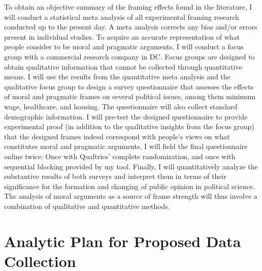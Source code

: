 \documentclass[11pt]{article}
\begin{document}
\vspace{0.3cm}

To obtain an objective summary of the framing effects found in the literature, I will conduct a statistical meta analysis of all experimental framing research conducted up to the present day. A meta analysis corrects any bias and/or errors present in individual studies. To acquire an accurate representation of what people consider to be moral and pragmatic arguments, I will conduct a focus group with a commercial research company in DC. Focus groups are designed to obtain qualitative information that cannot be collected through quantitative means. I will use the results from the quantitative meta analysis and the qualitative focus group to design a survey questionnaire that assesses the effects of moral and pragmatic frames on several political issues, among them minimum wage, healthcare, and housing. The questionnaire will also collect standard demographic information. I will pre-test the designed questionnaire to provide experimental proof (in addition to the qualitative insights from the focus group) that the designed frames indeed correspond with people's views on what constitutes moral and pragmatic arguments. I will field the final questionnaire online twice: Once with Qualtrics' complete randomization, and once with sequential blocking provided by my tool. Finally, I will quantitatively analyze the substantive results of both surveys and interpret them in terms of their significance for the formation and changing of public opinion in political science. The analysis of moral arguments as a source of frame strength will thus involve a combination of qualitative and quantitative methods. 



\section*{Analytic Plan for Proposed Data Collection}
\end{document}
